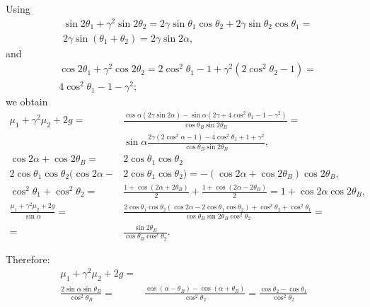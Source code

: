 \documentclass[preprint]{iucr}              %
\begin{document}
Using
\begin{align}
    &\sin2\theta_1+\gamma^2\sin2\theta_2=
    2\gamma\sin\theta_1\cos\theta_2+2\gamma\sin\theta_2\cos\theta_1=\nonumber \\
    &2\gamma\sin(\theta_1+\theta_2)=
    2\gamma\sin2\alpha,
\end{align}
and
\begin{align}
    &\cos2\theta_1+\gamma^2\cos2\theta_2=
    2\cos^2\theta_1-1+\gamma^2(2\cos^2\theta_2-1)=\nonumber \\
    &4\cos^2\theta_1-1-\gamma^2;
\end{align}
we obtain
\begin{align}
    \mu_1+\gamma^2\mu_2+2g =&
    \frac{\cos\alpha(2\gamma\sin2\alpha)-\sin\alpha(2\gamma+4\cos^2\theta_1-1-\gamma^2)}{\cos\theta_B\sin2\theta_B} = \nonumber \\
    & \sin\alpha
    \frac{2\gamma(2\cos^2\alpha-1)-4\cos^2\theta_1+1+\gamma^2}{\cos\theta_B\sin2\theta_B}, \nonumber \\
    \cos2\alpha+\cos2\theta_B = & 2\cos\theta_1\cos\theta_2
    \nonumber \\
    2\cos\theta_1\cos\theta_2(\cos2\alpha- & 2\cos\theta_1\cos\theta_2) =  -(\cos2\alpha+\cos2\theta_B)\cos2\theta_B, \nonumber \\
    \cos^2\theta_1+\cos^2\theta_2 = &
    \frac{1+\cos(2\alpha+2\theta_B)}{2} + 
    \frac{1+\cos(2\alpha-2\theta_B)}{2} = 
    1+\cos2\alpha\cos2\theta_B, \nonumber \\
    \frac{\mu_1+\gamma^2\mu_2+2g}{\sin\alpha} = &
    \frac{2\cos\theta_1\cos\theta_2(\cos2\alpha-2\cos\theta_1\cos\theta_2)+\cos^2\theta_2+\cos^2\theta_1}{\cos\theta_B\sin2\theta_B\cos^2\theta_2} = \nonumber  \\
    = & \frac{\sin2\theta_B}{\cos\theta_B\cos^2\theta_2}. \nonumber 
\end{align}

Therefore:
\begin{align}
    \mu_1+\gamma^2\mu_2+2g = & \nonumber \\
    \frac{2\sin\alpha\sin\theta_B}{\cos^2\theta_B} = &
    \frac{\cos(\alpha-\theta_B)-\cos(\alpha+\theta_B)}{\cos^2\theta_2}=
    \frac{\cos\theta_2-\cos\theta_1}{\cos^2\theta_2}
\end{align}





\end{document}
